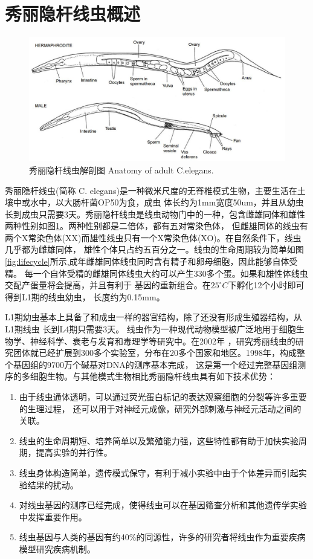 \section{秀丽隐杆线虫概述}
	\begin{figure}[h]
	  \centering
	  \includegraphics[width=14cm]{figure/chap1/Celegans.jpg}
	  \bicaption
		{秀丽隐杆线虫解剖图}
		{Anatomy of adult C.elegans.}
	  \label{fig:Celegans}
	\end{figure}
	秀丽隐杆线虫(简称 C. elegans)是一种微米尺度的无脊椎模式生物，主要生活在土壤中或水中，以大肠杆菌OP50为食，成虫
	体长约为1mm宽度50um，并且从幼虫长到成虫只需要3天。秀丽隐杆线虫是线虫动物门中的一种，包含雌雄同体和雄性两种性别如图\ref{fig:Celegans}。两种性别都是二倍体，都有五对常染色体，
	但雌雄同体的线虫有两个X常染色体(XX)而雄性线虫只有一个X常染色体(XO)。在自然条件下，线虫几乎都为雌雄同体，
	雄性个体只占约五百分之一。线虫的生命周期较为简单如图\ref{fig:lifecycle}所示,成年雌雄同体线虫同时含有精子和卵母细胞，因此能够自体受精。
	每一个自体受精的雌雄同体线虫大约可以产生330多个蛋。如果和雄性体线虫交配产蛋量将会提高，并且有利于
	基因的重新组合。在$25^\circ C$下孵化12个小时即可得到L1期的线虫幼虫，
	长度约为0.15mm。
	
	L1期幼虫基本上具备了和成虫一样的器官结构，除了还没有形成生殖器结构，从L1期线虫
	长到L4期只需要3天。
	线虫作为一种现代动物模型被广泛地用于细胞生物学、神经科学、衰老与发育和毒理学等研究中。在2002年
	，研究秀丽线虫的研究团体就已经扩展到300多个实验室，分布在20多个国家和地区。1998年，构成整个基因组的9700万个碱基对DNA的测序基本完成，
	这是第一个经过完整基因组测序的多细胞生物。与其他模式生物相比秀丽隐杆线虫具有如下技术优势：
	
	\begin{enumerate}[label={\alph*)},font={\color{black!50!black}\bfseries}]
	  \item 由于线虫通体透明，可以通过荧光蛋白标记的表达观察细胞的分裂等许多重要的生理过程，
	  还可以用于对神经元成像，研究外部刺激与神经元活动之间的关联。
	  \item 线虫的生命周期短、培养简单以及繁殖能力强，这些特性都有助于加快实验周期，提高实验的并行性。
	  \item 线虫身体构造简单，遗传模式保守，有利于减小实验中由于个体差异而引起实验结果的扰动。
	  \item 对线虫基因的测序已经完成，使得线虫可以在基因筛查分析和其他遗传学实验中发挥重要作用。
	  \item 线虫基因与人类的基因有约40\%的同源性，许多的研究者将线虫作为重要疾病模型研究疾病机制。
	\end{enumerate}
	

